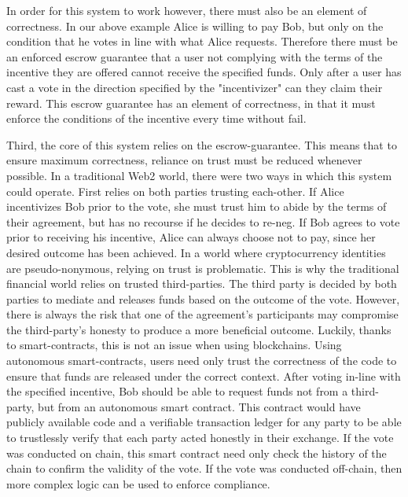 \documentclass{article}
\begin{document}
In order for this system to work however, there must also be an element of correctness. In our above example Alice is willing to pay Bob, but only on the condition that he votes in line with what Alice requests. Therefore there must be an enforced escrow guarantee that a user not complying with the terms of the incentive they are offered cannot receive the specified funds. Only after a user has cast a vote in the direction specified by the "incentivizer" can they claim their reward. This escrow guarantee has an element of correctness, in that it must enforce the conditions of the incentive every time without fail.

Third, the core of this system relies on the escrow-guarantee. This means that to ensure maximum correctness, reliance on trust must be reduced whenever possible. In a traditional Web2 world, there were two ways in which this system could operate. First relies on both parties trusting each-other. If Alice incentivizes Bob prior to the vote, she must trust him to abide by the terms of their agreement, but has no recourse if he decides to re-neg. If Bob agrees to vote prior to receiving his incentive, Alice can always choose not to pay, since her desired outcome has been achieved. In a world where cryptocurrency identities are pseudo-nonymous, relying on trust is problematic. This is why the traditional financial world relies on trusted third-parties. The third party is decided by both parties to mediate and releases funds based on the outcome of the vote. However, there is always the risk that one of the agreement's participants may compromise the third-party's honesty to produce a more beneficial outcome. Luckily, thanks to smart-contracts, this is not an issue when using blockchains. Using autonomous smart-contracts, users need only trust the correctness of the code to ensure that funds are released under the correct context. After voting in-line with the specified incentive, Bob should be able to request funds not from a third-party, but from an autonomous smart contract. This contract would have publicly available code and a verifiable transaction ledger for any party to be able to trustlessly verify that each party acted honestly in their exchange. If the vote was conducted on chain, this smart contract need only check the history of the chain to confirm the validity of the vote. If the vote was conducted off-chain, then more complex logic can be used to enforce compliance. 
\end{document}
